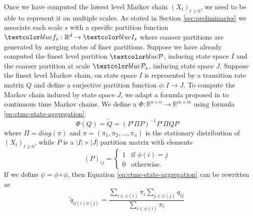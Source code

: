 Once we have computed the lowest level Markov chain $(X_t)_{t \ge 0}$, we need to be able to represent it on multiple scales.
As stated in Section \ref{sec:preliminaries} we associate each scale $s$ with a specific partition function
$\lstopar{f_s}: \mathbb{R}^d \rightarrow \lstopar{I_s}$ where coarser partitions are generated by merging 
states of finer partitions.
Suppose we have already computed the finest level partition $\lstopar{\cP}$, inducing state space $I$ and the
coarser partition at scale $\lstopar{\cP_s}$, inducing state space $J$. Suppose the finest level Markov chain,
on state space $I$ is represented by a transition rate matrix $Q$ and define a surjective partition function
$\phi: I \rightarrow J$. To compute the Markov chain induced by state space $J$, we adapt a formula proposed
in \cite{5746509} to continuous time Markov chains. We define a 
$\Phi: \mathbb{R}^{n \times n} \rightarrow \mathbb{R}^{m \times m}$ using formula \ref{eq:ctmc-state-aggregation}.
\begin{equation}
	\label{eq:ctmc-state-aggregation}
	\Phi(Q) = \tilde{Q} = (P' \Pi P)^{-1} P' \Pi Q P
\end{equation}
where $\Pi = diag(\pi)$ and $\pi = (\pi_1, \pi_2, ..., \pi_n)$ is the stationary distribution of $(X_t)_{t \ge 0}$, while $P$ is a 
$|I| \times |J|$ partition matrix with elements
\begin{equation}
	\nonumber
	\left(P\right)_{ij} = 
		\left\{
			\begin{array}{ll}
				1 & \mbox{if } \phi(i) = j \\
				0 & \mbox{otherwise}.
			\end{array}
		\right.
\end{equation}
If we define $\psi = \phi \circ \phi$, then Equation \ref{eq:ctmc-state-aggregation} can be rewritten as
\begin{equation}
	\nonumber
	\tilde{q}_{\phi(i)\phi(j)} = \frac{\sum\limits_{i \in \psi(i)}\pi_i \sum\limits_{j \in \psi(j)} q_{ij}}{\sum\limits_{i \in \psi(i)}\pi_i}
\end{equation}